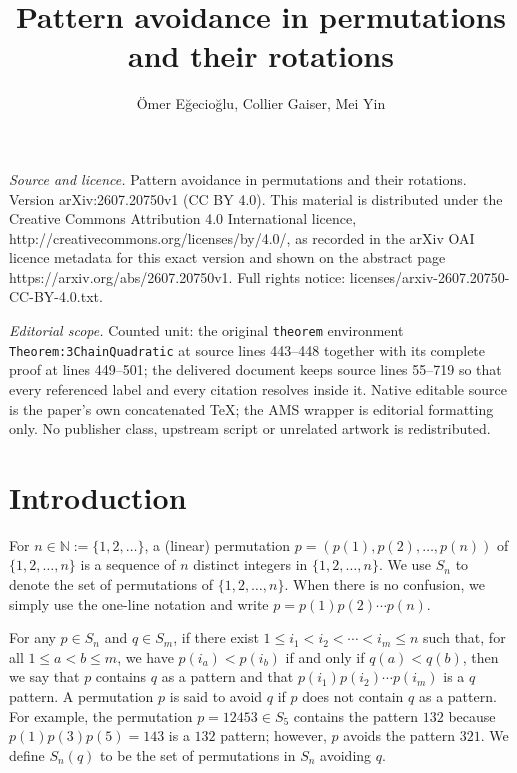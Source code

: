 \documentclass[10pt,a4paper]{amsart}
\numberwithin{equation}{section}
\begin{document}
\title[Pattern avoidance in permutations and their rotations]{Pattern avoidance in permutations and their rotations}
\author{Ömer Eğecioğlu, Collier Gaiser, Mei Yin}
\date{}
\maketitle
\noindent\emph{Source and licence.} Pattern avoidance in permutations and their rotations. Version arXiv:2607.20750v1 (CC BY 4.0). This material is distributed under the Creative Commons Attribution 4.0 International licence, http://creativecommons.org/licenses/by/4.0/, as recorded in the arXiv OAI licence metadata for this exact version and shown on the abstract page https://arxiv.org/abs/2607.20750v1. Full rights notice: licenses/arxiv-2607.20750-CC-BY-4.0.txt.\par\smallskip
\noindent\textit{Editorial scope.} Counted unit: the original \texttt{theorem} environment \texttt{Theorem:3ChainQuadratic} at source lines 443--448 together with its complete proof at lines 449--501; the delivered document keeps source lines 55--719 so that every referenced label and every citation resolves inside it. Native editable source is the paper's own concatenated TeX; the AMS wrapper is editorial formatting only. No publisher class, upstream script or unrelated artwork is redistributed.
\section{Introduction}\label{Section:Intro}

For $n\in\mathbb{N}:=\{1,2,\ldots\}$, a (linear) permutation $p=(p(1),p(2),\ldots, p(n))$ 
of $\{1,2,\ldots,n\}$ is a sequence of $n$ distinct integers in $\{1,2,\ldots,n\}$. We use $S_n$ to denote the set of permutations of $\{1,2,\ldots,n\}$. 
When there is no confusion, we simply use the one-line notation and write  $p=p(1)p(2)\cdots p(n)$.

For any $p\in S_n$ and $q\in S_m$, if there exist $1\leq i_1<i_2<\cdots<i_m\leq n$ such that, for all $1\leq a<b\leq m$, we have $p(i_a)<p(i_b)$ if and only if $q(a)<q(b)$, 
then we say that $p$ contains $q$ as a pattern and 
that $p(i_1)p(i_2)\cdots p(i_m)$ is a $q$ pattern.
A permutation
$p$ is said to avoid $q$ if $p$ does not contain $q$ as a pattern. For example, the permutation $p=12453\in S_5$ contains the pattern $132$ because $p(1)p(3)p(5)=143$ is a $132$ pattern; however, $p$ avoids the pattern $321$.
We define $S_n(q)$ to be the set of permutations in $S_n$ avoiding $q$.
\end{document}
